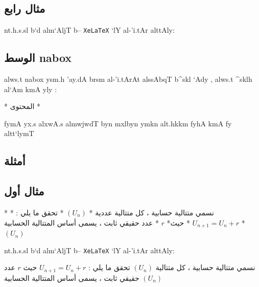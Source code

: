 \documentclass[8pt,a4paper]{article}
\begin{document}
\subsection*{مثال رابع}
\begin{arab}
\begin{boxlis}
\end{boxlis}
nt.h.s.sl b`d alm`AljT b-- \texttt{XeLaTeX}
`lY al-'i.tAr alttAly:
\end{arab}
\subsection{الوسط \textfrench{nabox} }
\begin{arab}
alws.t \textfrench{nabox} ysm.h 'ay.dA brsm al-'i.tArAt alssAbqT b^skl `Ady , alws.t ^sklh al`Am kmA yly :
\begin{boxlis}
\begin{nabox}[style=?,pluriel,degrade,name={\textarabic{...}},notitle]
*\textarabic{\bantii
المحتوى }*
\end{nabox}
\end{boxlis}
\begin{NAA}
fymA yx.s alxwA.s almwjwdT byn mxlbyn ymkn alt.hkkm fyhA kmA fy altt`lymT 
\LR{ \verb# \env #}
\end{NAA}
\end{arab}
\subsection*{أمثلة}
\subsection*{مثال أول}
\begin{arab}
\begin{boxlis}
\begin{nabox}[style=mital]
*\textarabic{\bantii
نسمي متتالية حسابية ، كل متتالية عددية   }*
$(U_n)$
*\textarabic{\bantii
تحقق ما يلي : }*
$U_{n+1}=U_n+r$
*\textarabic{\bantii
حيث}*
$r$
*\textarabic{\bantii
عدد حقيقي ثابت ، يسمى أساس المتتالية الحسابية }*
$(U_n)$
\end{nabox}
\end{boxlis}
nt.h.s.sl b`d alm`AljT b-- \texttt{XeLaTeX}
`lY al-'i.tAr alttAly:
\end{arab}
\begin{nabox}[style=mital]
نسمي متتالية حسابية 
، كل متتالية 
$(U_n)$
تحقق ما يلي :
$U_{n+1}=U_n+r$
حيث 
$r$
عدد حقيقي ثابت ، يسمى أساس المتتالية الحسابية 
$(U_n)$
\end{nabox}
\end{document}
